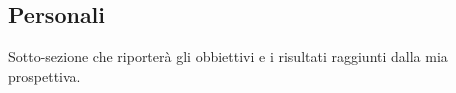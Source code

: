 \subsection{Personali}

Sotto-sezione che riporterà gli obbiettivi e i risultati raggiunti dalla mia prospettiva.
